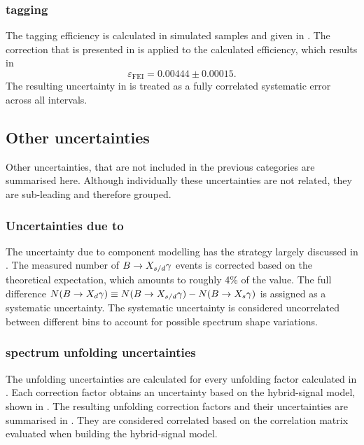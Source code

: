 \subsubsection{\texorpdfstring{\BtoXsgamma}{B->Xs gamma} tagging}

The tagging efficiency is calculated in simulated samples and given in .
The correction that is presented in  is applied to the calculated efficiency, which results in
\begin{equation}\label{eq:tag_efficiency_with_uncertainty}
    \varepsilon_{\mathrm{FEI}} = 0.00444\pm0.00015.
\end{equation}
The resulting uncertainty in  is treated as a fully correlated systematic error across all \EB intervals.

\subsection{Other uncertainties}\label{sec:other_uncertainties}

Other uncertainties, that are not included in the previous categories are summarised here.
Although individually these uncertainties are not related, they are sub-leading and therefore grouped.

\subsubsection{Uncertainties due to \texorpdfstring{\BtoXdgamma}{B->Xd gamma}}\label{sec:xdgamma_systematic}

The uncertainty due to \BtoXdgamma component modelling has the strategy largely discussed in .
The measured number of $\BtoXsdgamma$ events is corrected based on the theoretical \BtoXdgamma expectation, which amounts to roughly 4\% of the value.
The full difference $N(\BtoXdgamma) \equiv N(\BtoXsdgamma)-N(\BtoXsgamma)$ is assigned as a systematic uncertainty.
The systematic uncertainty is considered uncorrelated between different \EB bins to account for possible spectrum shape variations.

\subsubsection{\texorpdfstring{\EB}{EB} spectrum unfolding uncertainties}\label{sec:unfolding_systematic}

The unfolding uncertainties are calculated for every unfolding factor calculated in .
Each correction factor obtains an uncertainty based on the hybrid-signal model, shown in .
The resulting unfolding correction factors and their uncertainties are summarised in .
They are considered correlated based on the correlation matrix evaluated when building the hybrid-signal model.

